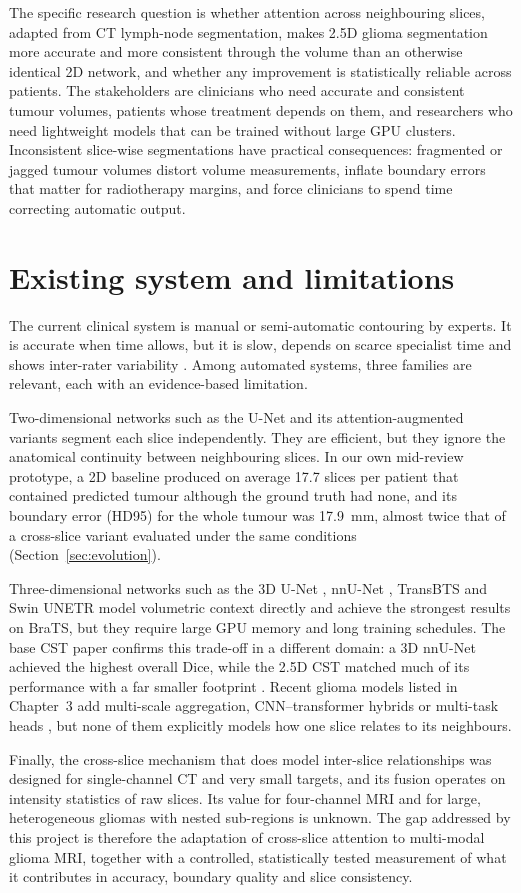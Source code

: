 The specific research question is whether attention across neighbouring slices, adapted from CT lymph-node segmentation, makes 2.5D glioma segmentation more accurate and more consistent through the volume than an otherwise identical 2D network, and whether any improvement is statistically reliable across patients. The stakeholders are clinicians who need accurate and consistent tumour volumes, patients whose treatment depends on them, and researchers who need lightweight models that can be trained without large GPU clusters. Inconsistent slice-wise segmentations have practical consequences: fragmented or jagged tumour volumes distort volume measurements, inflate boundary errors that matter for radiotherapy margins, and force clinicians to spend time correcting automatic output.

\section{Existing system and limitations}
The current clinical system is manual or semi-automatic contouring by experts. It is accurate when time allows, but it is slow, depends on scarce specialist time and shows inter-rater variability \cite{menze2015}. Among automated systems, three families are relevant, each with an evidence-based limitation.

Two-dimensional networks such as the U-Net \cite{ronneberger2015} and its attention-augmented variants segment each slice independently. They are efficient, but they ignore the anatomical continuity between neighbouring slices. In our own mid-review prototype, a 2D baseline produced on average 17.7 slices per patient that contained predicted tumour although the ground truth had none, and its boundary error (HD95) for the whole tumour was 17.9~mm, almost twice that of a cross-slice variant evaluated under the same conditions (Section~\ref{sec:evolution}).

Three-dimensional networks such as the 3D U-Net \cite{cicek2016}, nnU-Net \cite{isensee2021}, TransBTS \cite{wang2021transbts} and Swin UNETR \cite{hatamizadeh2022swin} model volumetric context directly and achieve the strongest results on BraTS, but they require large GPU memory and long training schedules. The base CST paper confirms this trade-off in a different domain: a 3D nnU-Net achieved the highest overall Dice, while the 2.5D CST matched much of its performance with a far smaller footprint \cite{abdikenov2026}. Recent glioma models listed in Chapter~3 add multi-scale aggregation, CNN--transformer hybrids or multi-task heads \cite{aslam2025,li2025deepglioseg,wen2025}, but none of them explicitly models how one slice relates to its neighbours.

Finally, the cross-slice mechanism that does model inter-slice relationships \cite{abdikenov2026} was designed for single-channel CT and very small targets, and its fusion operates on intensity statistics of raw slices. Its value for four-channel MRI and for large, heterogeneous gliomas with nested sub-regions is unknown. The gap addressed by this project is therefore the adaptation of cross-slice attention to multi-modal glioma MRI, together with a controlled, statistically tested measurement of what it contributes in accuracy, boundary quality and slice consistency.
